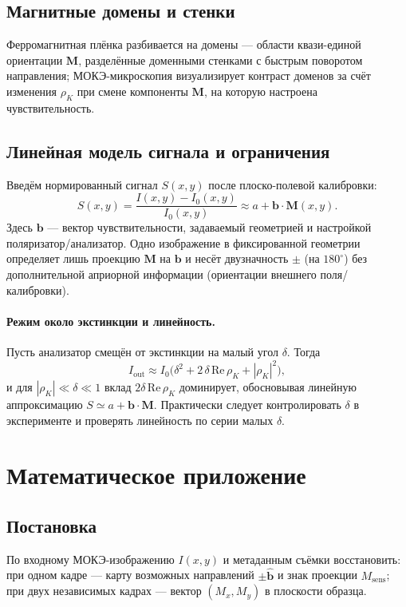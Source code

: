 \documentclass[12pt,a4paper]{article}
\numberwithin{equation}{section}
\begin{document}
\subsection{Магнитные домены и стенки}
Ферромагнитная плёнка разбивается на домены — области квази-единой ориентации \(\mathbf M\), разделённые доменными стенками с быстрым поворотом направления; МОКЭ-микроскопия визуализирует контраст доменов за счёт изменения \(\rho_K\) при смене компоненты \(\mathbf M\), на которую настроена чувствительность.

\subsection{Линейная модель сигнала и ограничения}
Введём нормированный сигнал \(S(x,y)\) после плоско-полевой калибровки:
\begin{equation}
 S(x,y)=\frac{I(x,y)-I_0(x,y)}{I_0(x,y)} \approx a + \mathbf b \cdot \mathbf M(x,y).
\end{equation}
Здесь \(\mathbf b\) — вектор чувствительности, задаваемый геометрией и настройкой поляризатор/анализатор. Одно изображение в фиксированной геометрии определяет лишь проекцию \(\mathbf M\) на \(\mathbf b\) и несёт двузначность \(\pm\) (на \(180^\circ\)) без дополнительной априорной информации (ориентации внешнего поля/калибровки).

\paragraph{Режим около экстинкции и линейность.}
Пусть анализатор смещён от экстинкции на малый угол \(\delta\). Тогда
\begin{equation}
 I_{\text{out}} \approx I_0\Big(\delta^2 + 2\,\delta\,\mathrm{Re}\,\rho_K + |\rho_K|^2\Big),
\end{equation}
и для \(|\rho_K| \ll \delta \ll 1\) вклад \(2\delta\,\mathrm{Re}\,\rho_K\) доминирует, обосновывая линейную аппроксимацию \(S\simeq a+\mathbf b\cdot\mathbf M\). Практически следует контролировать \(\delta\) в эксперименте и проверять линейность по серии малых \(\delta\).

\section{Математическое приложение}
\subsection{Постановка}
По входному МОКЭ-изображению \(I(x,y)\) и метаданным съёмки восстановить: при одном кадре — карту возможных направлений \(\pm\hat{\mathbf b}\) и знак проекции \(M_{\text{sens}}\); при двух независимых кадрах — вектор \((M_x,M_y)\) в плоскости образца.
\end{document}
